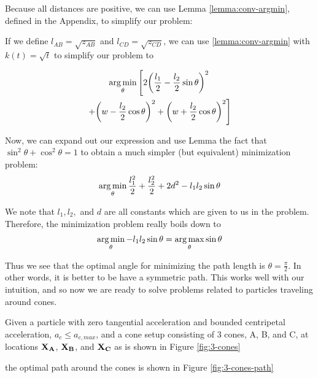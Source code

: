 Because all distances are positive, we can use Lemma \ref{lemma:conv-argmin}, defined in the Appendix, to simplify our problem:

If we define $l_{AB} = \sqrt{z_{AB}}$ and $l_{CD} = \sqrt{z_{CD}}$, we can use \ref{lemma:conv-argmin} with $k(t) = \sqrt{t}$ to simplify our problem to

\begin{multline}
  \argmin_{\theta} \left[ 2\paren{\frac{l_1}{2} - \frac{l_2}{2} \sin\theta}^2 \right.\\
  \left. + \paren{w - \frac{l_2}{2} \cos\theta}^2 + \paren{w + \frac{l_2}{2} \cos\theta}^2 \right]
\end{multline}

Now, we can expand out our expression and use Lemma the fact that $\sin^2 \theta + \cos^2 \theta = 1$ to obtain a much simpler (but equivalent) minimization problem:
\begin{eqnarray}
  \operatorname*{arg\,min}_{\theta} \frac{l_1^2}{2} + \frac{l_2^2}{2} + 2d^2 - l_1 l_2 \sin \theta
\end{eqnarray}

We note that $l_1, l_2,$ and $d$ are all constants which are given to us in the problem. Therefore, the minimization problem really boils down to
\begin{eqnarray}
  \operatorname*{arg\,min}_{\theta} - l_1 l_2 \sin \theta = \operatorname*{arg\,max}_{\theta} \sin \theta
\end{eqnarray}

Thus we see that the optimal angle for minimizing the path length is $\theta = \frac{\pi}{2}$. In other words, it is better to be have a symmetric path. This works well with our intuition, and so now we are ready to solve problems related to particles traveling around cones.


\begin{theorem}

Given a particle with zero tangential acceleration and bounded centripetal acceleration, $a_c \le a_{c,max}$, and a cone setup consisting of 3 cones, A, B, and C, at locations $\mathbf{X_A}$, $\mathbf{X_B}$, and $\mathbf{X_C}$ as is shown in Figure \ref{fig:3-cones}


the optimal path around the cones is shown in Figure \ref{fig:3-cones-path}


\end{theorem}


